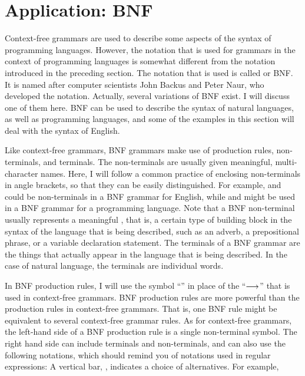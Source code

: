 \section{Application: BNF}\label{S-grammars-2}

Context-free grammars are used to describe some aspects of
the syntax of programming languages.  However, the notation
that is used for grammars in the context of programming languages
is somewhat different from the notation introduced in the
preceding section.  The notation that is used is called
 or BNF.  It is named after computer
scientists John Backus and Peter Naur, who developed the
notation.  Actually, several variations of BNF exist.
I will discuss one of them here.  BNF can be used to describe
the syntax of natural languages, as well as programming languages,
and some of the examples in this section will deal with the
syntax of English.

Like context-free grammars, BNF grammars make use of production rules, non-terminals,
and terminals.  The non-terminals are usually given meaningful,
multi-character names.  Here, I will follow a common practice
of enclosing non-terminals in angle brackets, so that they can
be easily distinguished.  For example,  and 
could be non-terminals in a BNF grammar for English, while
 and  might be used in a BNF grammar
for a programming language.  Note that a BNF non-terminal
usually represents a meaningful ,
that is, a certain type of building block in the syntax of
the language that is being described, such as an adverb,
a prepositional phrase, or a variable declaration statement.
The terminals of a BNF grammar are the things that actually
appear in the language that is being described.  In the case
of natural language, the terminals are individual words.

In BNF production rules, I will use the symbol ``\BNFPRODUCES''
in place of the ``$\longrightarrow$'' that is used in context-free grammars.
BNF production rules are more powerful than the production rules in
context-free grammars.  That is, one BNF rule might be equivalent to 
several context-free grammar rules.  As for context-free grammars,
the left-hand side of a BNF production rule is a single 
non-terminal symbol.  The right hand side can include terminals
and non-terminals, and can also use the following notations,
which should remind you of notations used in regular expressions:
\smallskip
\IItem{$\bullet\,\,$}A vertical bar, \BNFALT, indicates a choice of
   alternatives.  For example,
   
